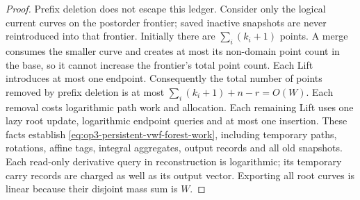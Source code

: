\begin{proof}
Prefix deletion does not escape this ledger. Consider only the logical
current curves on the postorder frontier; saved inactive snapshots are
never reintroduced into that frontier. Initially there are
$\sum_i(k_i+1)$ points. A merge consumes the smaller curve and creates
at most its non-domain point count in the base, so it cannot increase the
frontier's total point count. Each Lift introduces at most one endpoint.
Consequently the total number of points removed by prefix deletion is at
most $\sum_i(k_i+1)+n-r=O(W)$. Each removal costs logarithmic path work
and allocation. Each remaining Lift uses one lazy root update, logarithmic
endpoint queries and at most one insertion. These facts establish
\eqref{eq:op3-persistent-vwf-forest-work}, including temporary paths,
rotations, affine tags, integral aggregates, output records and all old
snapshots. Each read-only derivative query in reconstruction is logarithmic;
its temporary carry records are charged as well as its output vector.
Exporting all root curves is
linear because their disjoint mass sum is $W$.
\end{proof}

